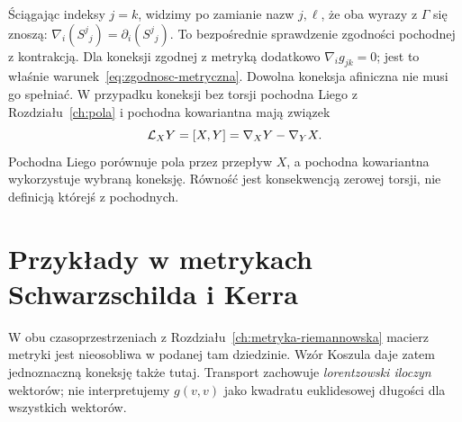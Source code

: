 Ściągając indeksy $j=k$, widzimy po zamianie nazw
$j,\ell$, że oba wyrazy z $\Gamma$ się znoszą:
$\nabla_i(S^j{}_j)=\partial_i(S^j{}_j)$.
To bezpośrednie sprawdzenie zgodności pochodnej z kontrakcją.
Dla koneksji zgodnej z metryką dodatkowo $\nabla_i g_{jk}=0$;
jest to właśnie warunek~\eqref{eq:zgodnosc-metryczna}.
Dowolna koneksja afiniczna nie musi go spełniać.
W przypadku koneksji bez torsji pochodna Liego
z Rozdziału~\ref{ch:pola} i pochodna
kowariantna mają związek
\begin{equation}\label{eq:lie-koneksja}
 \mathcal L_XY=[X,Y]=\nabla_XY-\nabla_YX.
\end{equation}
Pochodna Liego porównuje pola przez przepływ
$X$, a pochodna kowariantna wykorzystuje
wybraną koneksję. Równość jest konsekwencją
zerowej torsji, nie definicją którejś z pochodnych.

\section{Przykłady w metrykach Schwarzschilda i Kerra}
\label{sec:koneksja-schwarzschild-kerr}

W obu czasoprzestrzeniach z Rozdziału~\ref{ch:metryka-riemannowska}
macierz metryki jest nieosobliwa w podanej tam
dziedzinie. Wzór Koszula daje zatem jednoznaczną
koneksję także tutaj. Transport zachowuje
\emph{lorentzowski iloczyn} wektorów;
nie interpretujemy $g(v,v)$ jako kwadratu
euklidesowej długości dla wszystkich wektorów.

